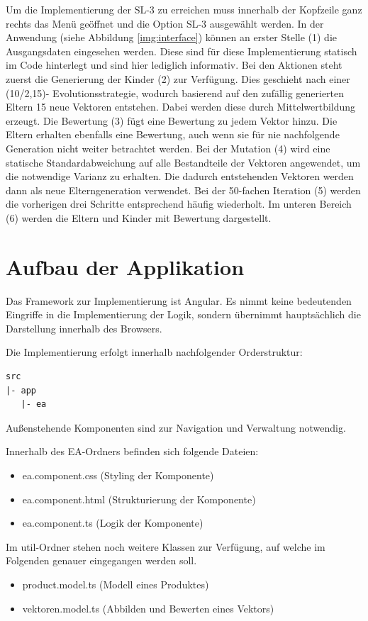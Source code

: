 \documentclass[]{scrartcl}
\begin{document}
Um die Implementierung der SL-3 zu erreichen muss innerhalb der Kopfzeile ganz rechts das Menü geöffnet und die Option SL-3 ausgewählt werden. In der Anwendung (siehe Abbildung \ref{img:interface}) können an erster Stelle (1) die Ausgangsdaten eingesehen werden. Diese sind für diese Implementierung statisch im Code hinterlegt und sind hier lediglich informativ. Bei den Aktionen steht zuerst die Generierung der Kinder (2) zur Verfügung. Dies geschieht nach einer (10/2,15)- Evolutionsstrategie, wodurch basierend auf den zufällig generierten Eltern 15 neue Vektoren entstehen. Dabei werden diese durch Mittelwertbildung erzeugt. Die Bewertung (3) fügt eine Bewertung zu jedem Vektor hinzu. Die Eltern erhalten ebenfalls eine Bewertung, auch wenn sie für nie nachfolgende Generation nicht weiter betrachtet werden. Bei der Mutation (4) wird eine statische Standardabweichung auf alle Bestandteile der Vektoren angewendet, um die notwendige Varianz zu erhalten. Die dadurch entstehenden Vektoren werden dann als neue Elterngeneration verwendet. Bei der 50-fachen Iteration (5) werden die vorherigen drei Schritte entsprechend häufig wiederholt. Im unteren Bereich (6) werden die Eltern und Kinder mit Bewertung dargestellt.

\section{Aufbau der Applikation}
\label{aufbau}
Das Framework zur Implementierung ist Angular. Es nimmt keine bedeutenden Eingriffe in die Implementierung der Logik, sondern übernimmt hauptsächlich die Darstellung innerhalb des Browsers.


Die Implementierung erfolgt innerhalb nachfolgender Orderstruktur:
\begin{lstlisting}[backgroundcolor=\color{lightgray}]
src
|- app
   |- ea
\end{lstlisting}
Außenstehende Komponenten sind zur Navigation und Verwaltung notwendig.

Innerhalb des EA-Ordners befinden sich folgende Dateien:
\begin{itemize}
\item ea.component.css (Styling der Komponente)
\item ea.component.html (Strukturierung der Komponente)
\item ea.component.ts (Logik der Komponente)
\end{itemize}

Im util-Ordner stehen noch weitere Klassen zur Verfügung, auf welche im Folgenden genauer eingegangen werden soll.
\begin{itemize}
	\item product.model.ts (Modell eines Produktes)
	\item vektoren.model.ts (Abbilden und Bewerten eines Vektors)
\end{itemize}
\end{document}
